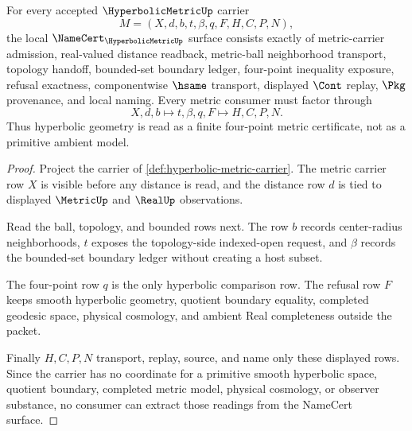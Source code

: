 \begin{theorem}
\label{thm:hyperbolic-metric-namecert-obligations}
For every accepted $\HyperbolicMetricUp$ carrier
$$
M=(X,d,b,t,\beta,q,F,H,C,P,N),
$$
the local $\NameCert_{\HyperbolicMetricUp}$ surface consists exactly of metric-carrier admission, real-valued distance readback, metric-ball neighborhood transport, topology handoff, bounded-set boundary ledger, four-point inequality exposure, refusal exactness, componentwise $\hsame$ transport, displayed $\Cont$ replay, $\Pkg$ provenance, and local naming. Every metric consumer must factor through
$$
X,d,b \longmapsto t,\beta,q,F \longmapsto H,C,P,N.
$$
Thus hyperbolic geometry is read as a finite four-point metric certificate, not as a primitive ambient model.
\end{theorem}
\begin{proof}
Project the carrier of \autoref{def:hyperbolic-metric-carrier}. The metric carrier row $X$ is visible before any distance is read, and the distance row $d$ is tied to displayed $\MetricUp$ and $\RealUp$ observations.

Read the ball, topology, and bounded rows next. The row $b$ records center-radius neighborhoods, $t$ exposes the topology-side indexed-open request, and $\beta$ records the bounded-set boundary ledger without creating a host subset.

The four-point row $q$ is the only hyperbolic comparison row. The refusal row $F$ keeps smooth hyperbolic geometry, quotient boundary equality, completed geodesic space, physical cosmology, and ambient Real completeness outside the packet.

Finally $H,C,P,N$ transport, replay, source, and name only these displayed rows. Since the carrier has no coordinate for a primitive smooth hyperbolic space, quotient boundary, completed metric model, physical cosmology, or observer substance, no consumer can extract those readings from the NameCert surface.
\end{proof}

